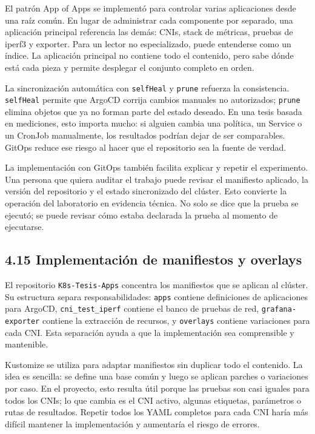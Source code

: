 El patrón App of Apps se implementó para controlar varias aplicaciones desde una raíz común. En lugar de administrar cada componente por separado, una aplicación principal referencia las demás: CNIs, stack de métricas, pruebas de iperf3 y exporter. Para un lector no especializado, puede entenderse como un índice. La aplicación principal no contiene todo el contenido, pero sabe dónde está cada pieza y permite desplegar el conjunto completo en orden.

La sincronización automática con \texttt{selfHeal} y \texttt{prune} refuerza la consistencia. \texttt{selfHeal} permite que ArgoCD corrija cambios manuales no autorizados; \texttt{prune} elimina objetos que ya no forman parte del estado deseado. En una tesis basada en mediciones, esto importa mucho: si alguien cambia una política, un Service o un CronJob manualmente, los resultados podrían dejar de ser comparables. GitOps reduce ese riesgo al hacer que el repositorio sea la fuente de verdad.

La implementación con GitOps también facilita explicar y repetir el experimento. Una persona que quiera auditar el trabajo puede revisar el manifiesto aplicado, la versión del repositorio y el estado sincronizado del clúster. Esto convierte la operación del laboratorio en evidencia técnica. No solo se dice que la prueba se ejecutó; se puede revisar cómo estaba declarada la prueba al momento de ejecutarse.

\subsection{4.15 Implementación de manifiestos y overlays}

El repositorio \texttt{K8s-Tesis-Apps} concentra los manifiestos que se aplican al clúster. Su estructura separa responsabilidades: \texttt{apps} contiene definiciones de aplicaciones para ArgoCD, \texttt{cni\_test\_iperf} contiene el banco de pruebas de red, \texttt{grafana-exporter} contiene la extracción de recursos, y \texttt{overlays} contiene variaciones para cada CNI. Esta separación ayuda a que la implementación sea comprensible y mantenible.

Kustomize se utiliza para adaptar manifiestos sin duplicar todo el contenido. La idea es sencilla: se define una base común y luego se aplican parches o variaciones por caso. En el proyecto, esto resulta útil porque las pruebas son casi iguales para todos los CNIs; lo que cambia es el CNI activo, algunas etiquetas, parámetros o rutas de resultados. Repetir todos los YAML completos para cada CNI haría más difícil mantener la implementación y aumentaría el riesgo de errores.

